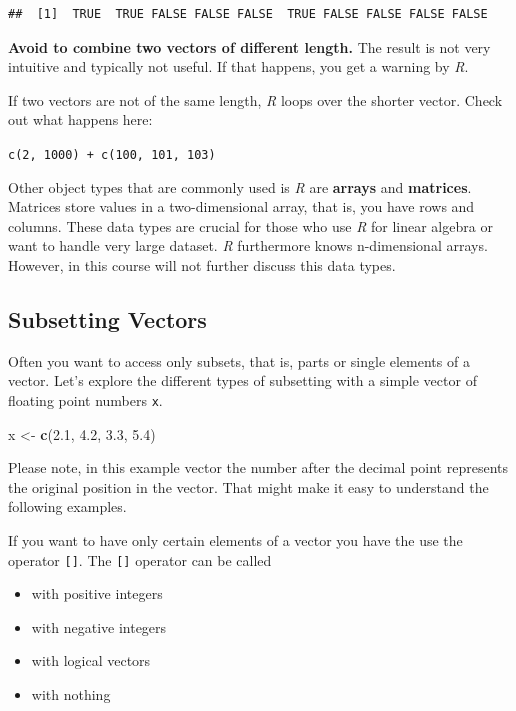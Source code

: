 \documentclass[
]{scrartcl}
\makeatletter
\newenvironment{Shaded}{\begin{snugshade}}{\end{snugshade}}
\newcommand{\FloatTok}[1]{\textcolor[rgb]{0.00,0.00,0.81}{#1}}
\newcommand{\KeywordTok}[1]{\textcolor[rgb]{0.13,0.29,0.53}{\textbf{#1}}}
\newcommand{\NormalTok}[1]{#1}
\newcommand{\StringTok}[1]{\textcolor[rgb]{0.31,0.60,0.02}{#1}}
\providecommand{\tightlist}{%
  \setlength{\itemsep}{0pt}\setlength{\parskip}{0pt}}
\newenvironment{kframe}{%
\medskip{}
\setlength{\fboxsep}{.8em}
 \def\at@end@of@kframe{}%
 \ifinner\ifhmode%
  \def\at@end@of@kframe{\end{minipage}}%
  \begin{minipage}{\columnwidth}%
 \fi\fi%
 \def\FrameCommand##1{\hskip\@totalleftmargin \hskip-\fboxsep
 \colorbox{shadecolor}{##1}\hskip-\fboxsep
     \hskip-\linewidth \hskip-\@totalleftmargin \hskip\columnwidth}%
 \MakeFramed {\advance\hsize-\width
   \@totalleftmargin\z@ \linewidth\hsize
   \@setminipage}}%
 {\par\unskip\endMakeFramed%
 \at@end@of@kframe}
\newenvironment{rmdblock}[1]
  {
  \begin{itemize}
  \renewcommand{\labelitemi}{
    \raisebox{-.7\height}[0pt][0pt]{
      {\setkeys{Gin}{width=3em,keepaspectratio}\texttt{[image: images/\#1]}}
    }
  }
  \setlength{\fboxsep}{1em}
  \begin{kframe}
  \item
  }
  {
  \end{kframe}
  \end{itemize}
  }
\newenvironment{geek}
    {\begin{rmdblock}{geek}}
    {\end{rmdblock}}
\makeatother
\begin{document}
\begin{verbatim}
##  [1]  TRUE  TRUE FALSE FALSE FALSE  TRUE FALSE FALSE FALSE FALSE
\end{verbatim}

\textbf{Avoid to combine two vectors of different length.} The result is not very intuitive and typically not useful. If that happens, you get a warning by \emph{R}.

\begin{geek}
If two vectors are not of the same length, \emph{R} loops over the
shorter vector. Check out what happens here:

\texttt{c(2,\ 1000)\ +\ c(100,\ 101,\ 103)}
\end{geek}

Other object types that are commonly used is \emph{R} are \textbf{arrays} and \textbf{matrices}. Matrices store values in a two-dimensional array, that is, you have rows and columns. These data types are crucial for those who use \emph{R} for linear algebra or want to handle very large dataset. \emph{R} furthermore knows n-dimensional arrays. However, in this course will not further discuss this data types.

\hypertarget{subsetting}{%
\subsection{Subsetting Vectors}\label{subsetting}}

Often you want to access only subsets, that is, parts or single elements of a vector. Let's explore the different types of subsetting with a simple vector of floating point numbers \texttt{x}.

\begin{Shaded}
\begin{Highlighting}[]
\NormalTok{x \textless{}{-}}\StringTok{ }\KeywordTok{c}\NormalTok{(}\FloatTok{2.1}\NormalTok{, }\FloatTok{4.2}\NormalTok{, }\FloatTok{3.3}\NormalTok{, }\FloatTok{5.4}\NormalTok{)}
\end{Highlighting}
\end{Shaded}

Please note, in this example vector the number after the decimal point represents the original position in the vector. That might make it easy to understand the following examples.

If you want to have only certain elements of a vector you have the use the operator \texttt{{[}{]}}. The \texttt{{[}{]}} operator can be called

\begin{itemize}
\tightlist
\item
  with positive integers
\item
  with negative integers
\item
  with logical vectors
\item
  with nothing
\end{itemize}
\end{document}

